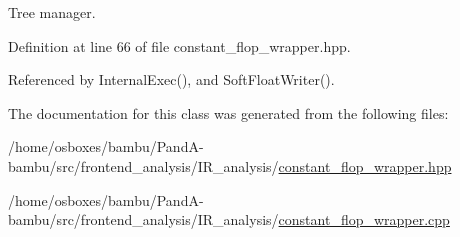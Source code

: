 Tree manager. 



Definition at line 66 of file constant\+\_\+flop\+\_\+wrapper.\+hpp.



Referenced by Internal\+Exec(), and Soft\+Float\+Writer().



The documentation for this class was generated from the following files\+:\begin{DoxyCompactItemize}
\item 
/home/osboxes/bambu/\+Pand\+A-\/bambu/src/frontend\+\_\+analysis/\+I\+R\+\_\+analysis/\hyperlink{constant__flop__wrapper_8hpp}{constant\+\_\+flop\+\_\+wrapper.\+hpp}\item 
/home/osboxes/bambu/\+Pand\+A-\/bambu/src/frontend\+\_\+analysis/\+I\+R\+\_\+analysis/\hyperlink{constant__flop__wrapper_8cpp}{constant\+\_\+flop\+\_\+wrapper.\+cpp}\end{DoxyCompactItemize}
